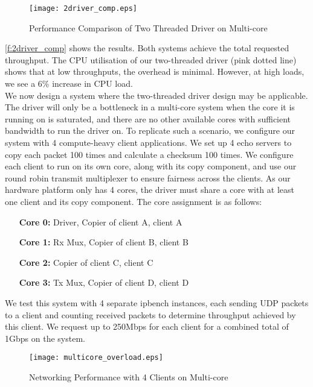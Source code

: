 \begin{figure}[h]
    \centering
    \texttt{[image: 2driver\_comp.eps]}
    \caption{Performance Comparison of Two Threaded Driver on Multi-core}
    \label{f:2driver_comp}
\end{figure}

\autoref{f:2driver_comp} shows the results. Both systems achieve the total requested throughput. The CPU utilisation of our 
two-threaded driver (pink dotted line) shows that at low throughputs, the overhead is minimal. However, at high loads, we
see a 6\% increase in CPU load.\\

We now design a system where the two-threaded driver design may be applicable. The driver will only be a bottleneck in a
multi-core system when the core it is running on is saturated, and there are no other available cores with sufficient bandwidth
to run the driver on. To replicate such a scenario, we configure our system with 4 compute-heavy client applications. We set up
4 echo servers to copy each packet 100 times and calculate a checksum 100 times. We configure each client to run on its own
core, along with its copy component, and use our round robin transmit multiplexer to ensure fairness across the clients. 
As our hardware platform only has 4 cores, the driver must share a core with at least one client and 
its copy component. The core assignment is as follows:
\begin{itemize}
    \item[\textbf{Core 0:}] Driver, Copier of client A, client A
    \item[\textbf{Core 1:}] Rx Mux, Copier of client B, client B
    \item[\textbf{Core 2:}] Copier of client C, client C
    \item[\textbf{Core 3:}] Tx Mux, Copier of client D, client D
\end{itemize}

We test this system with 4 separate ipbench instances, each sending UDP packets to a client and counting received packets
to determine throughput achieved by this client. We request up to 250Mbps for each client for a combined total of 1Gbps on the system.

\begin{figure}[h]
    \centering
    \texttt{[image: multicore\_overload.eps]}
    \caption{Networking Performance with 4 Clients on Multi-core}
    \label{f:multicore_overload}
\end{figure}


